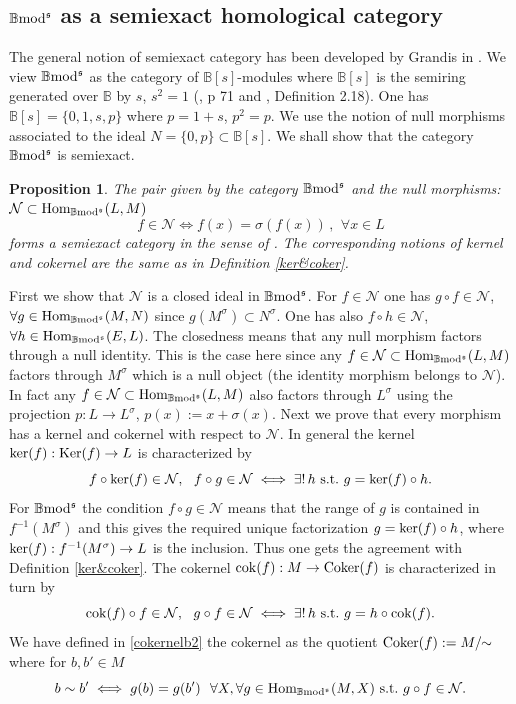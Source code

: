\documentclass[12pt]{article}
\newtheorem{prop}[thm]{Proposition}
\def\Hom{{\rm Hom}}
\def\sker{{\rm ker}}
\def\coker{{\rm Coker}}
\def\scoker{{\rm cok}}
\def\B{{\mathbb B}}
\def\cN{{\mathcal N}}
\def\qqq{\,,\,~\forall}
\def\bs{{\B[s]}}
\def\ker{{\mbox{Ker}}}
\def\Hom {{\mbox{Hom}}}
\def\b2{{\rm \B mod^{\mathfrak s}}}
\begin{document}
\subsection{$\b2$ as a semiexact homological category}\label{secthomol} 
  The general notion of semiexact category has been developed by Grandis in \cite{gra,gra1}. We view $\b2$ as the category of $\bs$-modules where $\bs$ is the semiring generated over $\B$ by $s$, $s^2=1$ (\!\cite{Gaubert}, p 71 and \cite{Akian}, Definition 2.18). One has $\bs=\{0,1,s,p\}$ where $p=1+s$, $p^2=p$. We use the notion of null morphisms associated to the ideal $N=\{0,p\}\subset \bs$. We shall  show that the category $\b2$ is semiexact. 
 \begin{prop}\label{grandis} The pair given by the category $\b2$ and the null morphisms: $\cN\subset \Hom_\b2(L,M)$
 $$
 f\in\cN \iff f(x)=\sigma(f(x))\qqq x\in L
 $$
 forms a semiexact category in the sense of \cite{gra,gra1}. The corresponding notions of kernel and cokernel are the same as in Definition \ref{ker&coker}.	
 \end{prop}
\proof First we show that $\cN$ is a closed ideal in $\b2$. For $f\in \cN$ one has $g\circ f\in \cN$, $\forall g\in \Hom_\b2(M,N)$ since $g(M^\sigma)\subset N^\sigma$. One has also $f\circ h\in \cN$, $\forall h\in\Hom_\b2(E,L)$. The closedness means that any null morphism factors through a null identity. This is the case here since any $f\in\cN\subset \Hom_\b2(L,M)$ factors through $M^\sigma$ which is a null object (the identity morphism belongs to $\cN$). In fact any $f\in\cN\subset \Hom_\b2(L,M)$ also factors through $L^\sigma$ using the projection $p:L\to L^\sigma$, $p(x):=x+\sigma(x)$.  Next we prove that every morphism has a kernel and cokernel with respect to $\cN$. In general the kernel $\sker(f):\ker(f)\to L$ is characterized by 
$$
f\circ \sker(f)\in \cN, \  \  f\circ g\in \cN\iff \exists!\, h~{\rm s.t.}~ g=\sker(f)\circ h.
$$
  For $\b2$ the condition $f\circ g\in \cN$ means that the range of $g$ is contained in $f^{-1}(M^\sigma)$ and this gives the required unique factorization $g=\sker(f)\circ h$, where $\sker(f):f^{-1}(M^\sigma)\to L$ is the inclusion. Thus one gets the agreement with  Definition \ref{ker&coker}. \newline
  The cokernel $\scoker(f):M\to \coker(f)$ is characterized in turn by 
$$
\scoker(f)\circ f\in \cN, \  \  g\circ f\in \cN\iff \exists!\, h~{\rm s.t.}~ g=h\circ \scoker(f).
$$
 We have defined in \eqref{cokernelb2} the  cokernel as the quotient $\coker(f):=M/\!\!\sim$ where for $b,b'\in M$
 \begin{equation}\label{cokernelb2bis1}
 b\sim b'\iff g(b)=g(b')\ \  \forall X, \forall g\in \Hom_\b2(M,X)~{\rm s.t.}~ g\circ f\in \cN.
\end{equation}
\end{document}
